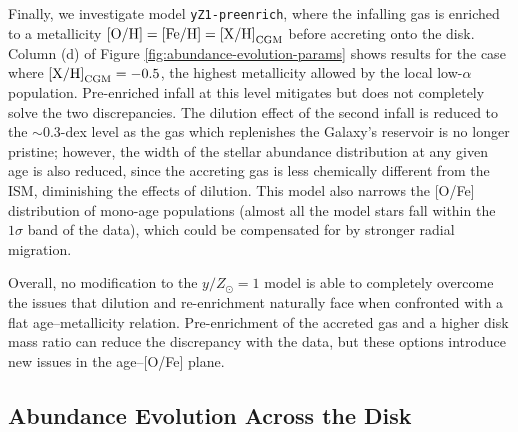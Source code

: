 \documentclass[twocolumn,twocolappendix,linenumbers]{aastex631}
\newcommand{\mathOH}{{\rm [O/H]}}
\newcommand{\mathFeH}{{\rm [Fe/H]}}
\newcommand{\yZ}[1]{$y/Z_\odot=#1$}
\begin{document}
Finally, we investigate model {\tt yZ1-preenrich}, where the infalling gas is enriched to a metallicity $\mathOH=\mathFeH={\rm [X/H]}_{\rm CGM}$ before accreting onto the disk. Column (d) of Figure \ref{fig:abundance-evolution-params} shows results for the case where ${\rm [X/H]}_{\rm CGM}=-0.5$, the highest metallicity allowed by the local low-$\alpha$ population. 
Pre-enriched infall at this level mitigates but does not completely solve the two discrepancies. The dilution effect of the second infall is reduced to the $\sim0.3$-dex level as the gas which replenishes the Galaxy's reservoir is no longer pristine; however, the width of the stellar abundance distribution at any given age is also reduced, since the accreting gas is less chemically different from the ISM, diminishing the effects of dilution. This model also narrows the [O/Fe] distribution of mono-age populations (almost all the model stars fall within the $1\sigma$ band of the data), which could be compensated for by stronger radial migration.

Overall, no modification to the \yZ{1} model is able to completely overcome the issues that dilution and re-enrichment naturally face when confronted with a flat age--metallicity relation. Pre-enrichment of the accreted gas and a higher disk mass ratio can reduce the discrepancy with the data, but these options introduce new issues in the age--[O/Fe] plane. 

\subsection{Abundance Evolution Across the Disk}
\label{sec:disk-evolution}
\end{document}
